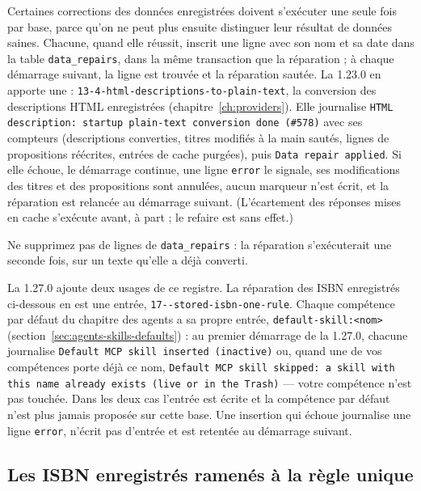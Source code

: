 Certaines corrections des données enregistrées doivent s'exécuter une
seule fois par base, parce qu'on ne peut plus ensuite distinguer leur
résultat de données saines. Chacune, quand elle réussit, inscrit une
ligne avec son nom et sa date dans la table
\texttt{data\_repairs}, dans la même transaction
que la réparation ; à chaque démarrage suivant, la ligne est trouvée et
la réparation sautée. La 1.23.0 en apporte une :
\texttt{13-4-html-\allowbreak descriptions-\allowbreak to-\allowbreak plain-\allowbreak text}, la conversion des
descriptions HTML enregistrées (chapitre~\ref{ch:providers}). Elle
journalise \texttt{HTML description: startup plain-text conversion done
(\#578)} avec ses compteurs (descriptions converties, titres modifiés à
la main sautés, lignes de propositions réécrites, entrées de cache
purgées), puis \texttt{Data repair applied}. Si elle échoue, le
démarrage continue, une ligne \texttt{error} le signale, ses
modifications des titres et des propositions sont annulées, aucun
marqueur n'est écrit, et la réparation est relancée au démarrage
suivant. (L'écartement des réponses mises en cache s'exécute avant,
à part ; le refaire est sans effet.)

\begin{warning}
Ne supprimez pas de lignes de \texttt{data\_repairs} : la réparation
s'exécuterait une seconde fois, sur un texte qu'elle a déjà converti.
\end{warning}

La 1.27.0 ajoute deux usages de ce registre. La réparation des ISBN
enregistrés ci-dessous en est une entrée,
\texttt{17--\allowbreak stored-\allowbreak isbn-\allowbreak one-\allowbreak rule}.
Chaque compétence par défaut du chapitre des agents a sa propre entrée,
\texttt{default-skill:\allowbreak <nom>}
(section~\ref{sec:agents-skills-defaults}) : au premier démarrage de la
1.27.0, chacune journalise \texttt{Default MCP skill inserted
(inactive)} ou, quand une de vos compétences porte déjà ce nom,
\texttt{Default MCP skill skipped: a skill with this name already exists
(live or in the Trash)} --- votre compétence n'est pas touchée. Dans les
deux cas l'entrée est écrite et la compétence par défaut n'est plus
jamais proposée sur cette base. Une insertion qui échoue journalise une
ligne \texttt{error}, n'écrit pas d'entrée et est retentée au démarrage
suivant.

\subsection*{Les ISBN enregistrés ramenés à la règle unique}

